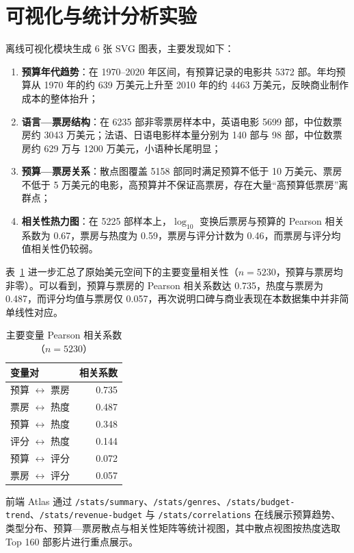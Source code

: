 \section{可视化与统计分析实验}
\label{sec:exp:visualization}

离线可视化模块生成 6 张 SVG 图表，主要发现如下：

\begin{enumerate}
    \item \textbf{预算年代趋势}：在 1970--2020 年区间，有预算记录的电影共 5372 部。年均预算从 1970 年的约 639 万美元上升至 2010 年的约 4463 万美元，反映商业制作成本的整体抬升；
    \item \textbf{语言—票房结构}：在 6235 部非零票房样本中，英语电影 5699 部，中位数票房约 3043 万美元；法语、日语电影样本量分别为 140 部与 98 部，中位数票房约 629 万与 1200 万美元，小语种长尾明显；
    \item \textbf{预算—票房关系}：散点图覆盖 5158 部同时满足预算不低于 10 万美元、票房不低于 5 万美元的电影，高预算并不保证高票房，存在大量“高预算低票房”离群点；
    \item \textbf{相关性热力图}：在 5225 部样本上，$\log_{10}$ 变换后票房与预算的 Pearson 相关系数为 0.67，票房与热度为 0.59，票房与评分计数为 0.46，而票房与评分均值相关性仍较弱。
\end{enumerate}

表~\ref{tab:correlation} 进一步汇总了原始美元空间下的主要变量相关性（$n=5230$，预算与票房均非零）。可以看到，预算与票房的 Pearson 相关系数达 0.735，热度与票房为 0.487，而评分均值与票房仅 0.057，再次说明口碑与商业表现在本数据集中并非简单线性对应。

\begin{table}[htbp]
    \centering
    \caption{主要变量 Pearson 相关系数（$n=5230$）} \label{tab:correlation}
    \renewcommand{\arraystretch}{1.2}
    \setlength{\tabcolsep}{12pt}
    \begin{tabular}{|l|r|}
        \hline
        \textbf{变量对} & \textbf{相关系数} \\
        \hline
        预算 $\leftrightarrow$ 票房   & 0.735 \\
        \hline
        票房 $\leftrightarrow$ 热度   & 0.487 \\
        \hline
        预算 $\leftrightarrow$ 热度   & 0.348 \\
        \hline
        评分 $\leftrightarrow$ 热度   & 0.144 \\
        \hline
        预算 $\leftrightarrow$ 评分   & 0.072 \\
        \hline
        票房 $\leftrightarrow$ 评分   & 0.057 \\
        \hline
    \end{tabular}
\end{table}

前端 Atlas 通过 \texttt{/stats/summary}、\texttt{/stats/genres}、\texttt{/stats/budget-trend}、\texttt{/stats/revenue-budget} 与 \texttt{/stats/correlations} 在线展示预算趋势、类型分布、预算—票房散点与相关性矩阵等统计视图，其中散点视图按热度选取 Top 160 部影片进行重点展示。

